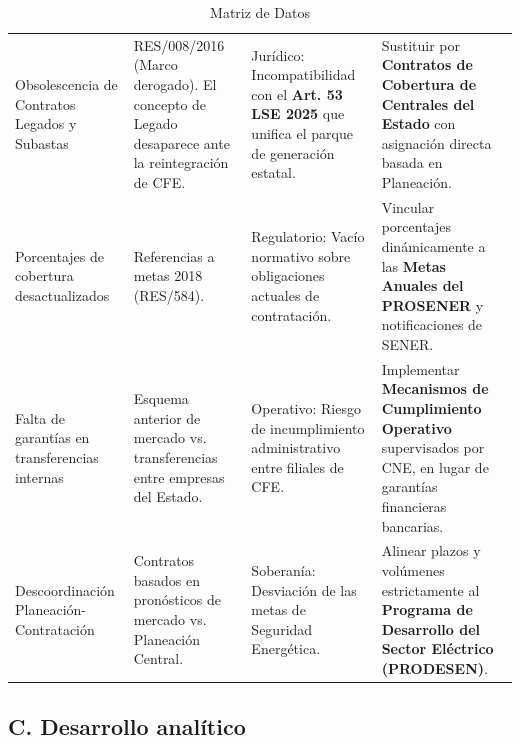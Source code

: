 \documentclass{cel}
\begin{document}
\vspace{0.3cm}
\begin{tabladoradoLargo}
\renewcommand{\tabularxcolumn}[1]{p{#1}}
\begin{xltabular}{\textwidth}{|X|X|X|X|}
\caption{Matriz de Datos} \\
\toprule
{}  &  &  &  \\
\midrule
\endhead
Obsolescencia de \textquotedbl{}Contratos Legados\textquotedbl{} y Subastas & RES/008/2016 (Marco derogado). El concepto de \textquotedbl{}Legado\textquotedbl{} desaparece ante la reintegración de CFE. & Jurídico: Incompatibilidad con el \textbf{Art. 53 LSE 2025} que unifica el parque de generación estatal. & Sustituir por \textbf{\textquotedbl{}Contratos de Cobertura de Centrales del Estado\textquotedbl{}} con asignación directa basada en Planeación. \\ \hline
Porcentajes de cobertura desactualizados & Referencias a metas 2018 (RES/584). & Regulatorio: Vacío normativo sobre obligaciones actuales de contratación. & Vincular porcentajes dinámicamente a las \textbf{Metas Anuales del PROSENER} y notificaciones de SENER. \\ \hline
Falta de garantías en transferencias internas & Esquema anterior de mercado vs. transferencias entre empresas del Estado. & Operativo: Riesgo de \textquotedbl{}incumplimiento administrativo\textquotedbl{} entre filiales de CFE. & Implementar \textbf{Mecanismos de Cumplimiento Operativo} supervisados por CNE, en lugar de garantías financieras bancarias. \\ \hline
Descoordinación Planeación-Contratación & Contratos basados en pronósticos de mercado vs. Planeación Central. & Soberanía: Desviación de las metas de Seguridad Energética. & Alinear plazos y volúmenes estrictamente al \textbf{Programa de Desarrollo del Sector Eléctrico (PRODESEN)}. \\ \hline
\bottomrule
\end{xltabular}
\end{tabladoradoLargo}

\subsection{C. Desarrollo analítico}
\nopagebreak
\end{document}
